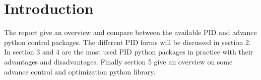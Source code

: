 
\section{Introduction}

The report give an overview and compare between the available  PID and advance python control packages. The different PID forms will be discussed in section 2. In section 3 and 4 are the most used PID python packages in practice with their advantages and disadvantages. Finally section 5 give an overview on some advance control and optimization python library.


\newpage
